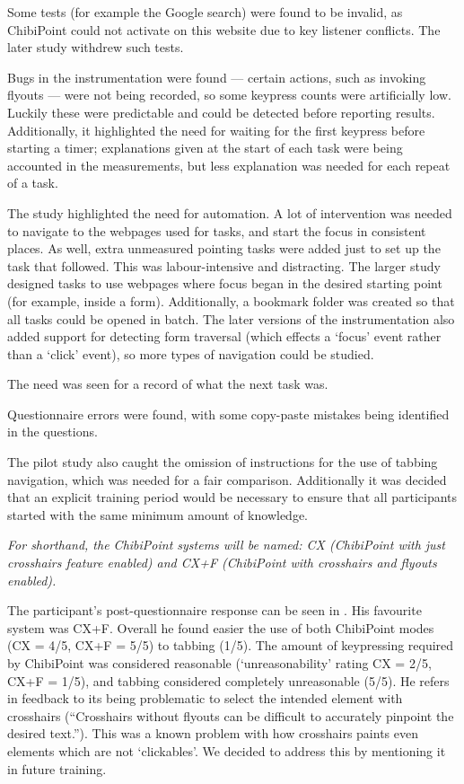 \documentclass[11pt,openright,a4paper]{report}
\begin{document}
Some tests (for example the Google search) were found to be invalid, as ChibiPoint could not activate on this website due to key listener conflicts. The later study withdrew such tests.

Bugs in the instrumentation were found --- certain actions, such as invoking flyouts --- were not being recorded, so some keypress counts were artificially low. Luckily these were predictable and could be detected before reporting results. Additionally, it highlighted the need for waiting for the first keypress before starting a timer; explanations given at the start of each task were being accounted in the measurements, but less explanation was needed for each repeat of a task.

The study highlighted the need for automation. A lot of intervention was needed to navigate to the webpages used for tasks, and start the focus in consistent places. As well, extra unmeasured pointing tasks were added just to set up the task that followed. This was labour-intensive and distracting. The larger study designed tasks to use webpages where focus began in the desired starting point (for example, inside a form). Additionally, a bookmark folder was created so that all tasks could be opened in batch. The later versions of the instrumentation also added support for detecting form traversal (which effects a `focus' event rather than a `click' event), so more types of navigation could be studied.

The need was seen for a record of what the next task was.

Questionnaire errors were found, with some copy-paste mistakes being identified in the questions.

The pilot study also caught the omission of instructions for the use of tabbing navigation, which was needed for a fair comparison. Additionally it was decided that an explicit training period would be necessary to ensure that all participants started with the same minimum amount of knowledge.

\textit{For shorthand, the ChibiPoint systems will be named: CX (ChibiPoint with just crosshairs feature enabled) and CX+F (ChibiPoint with crosshairs and flyouts enabled).}


The participant's post-questionnaire response can be seen in . His favourite system was CX+F. Overall he found easier the use of both ChibiPoint modes (CX = 4/5, CX+F = 5/5) to tabbing (1/5). The amount of keypressing required by ChibiPoint was considered reasonable (`unreasonability' rating CX = 2/5, CX+F = 1/5), and tabbing considered completely unreasonable (5/5). He refers in feedback to its being problematic to select the intended element with crosshairs (``Crosshairs without flyouts can be difficult to accurately pinpoint the desired text.''). This was a known problem with how crosshairs paints even elements which are not `clickables'. We decided to address this by mentioning it in future training.
\end{document}
